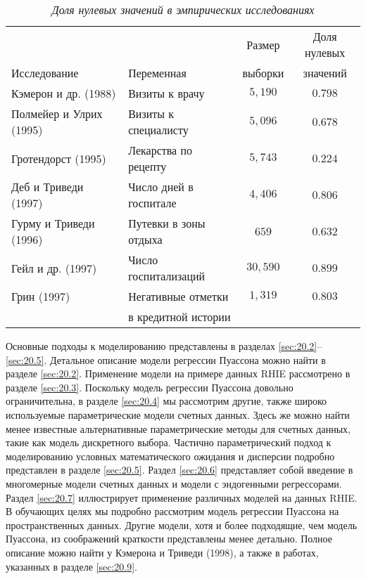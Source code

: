     \begin{table}[!ht]\caption{\textit{Доля нулевых значений в эмпирических исследованиях}}\label{tab:20.1}
    \begin{center}
\begin{tabular}{llcc}
\hline \hline
                          &               &Размер         &Доля нулевых\\
Исследование              &Переменная     &выборки        &значений\\
\hline
Кэмерон и др. (1988)     &Визиты к врачу&$5,190$&$0.798$\\
Полмейер и Улрих (1995) &Визиты к специалисту&$5,096$&$0.678$\\
Гротендорст (1995)       &Лекарства по рецепту&$5,743$&$0.224$\\
Деб и Триведи (1997)      &Число дней в госпитале&$4,406$&$0.806$\\
Гурму и Триведи (1996)    &Путевки в зоны отдыха&$659$&$0.632$\\
Гейл и др. (1997)        &Число госпитализаций&$30,590$&$0.899$\\
Грин (1997)             &Негативные отметки&$1,319$&$0.803$\\
                          &в кредитной истории&&\\
\hline \hline
    \end{tabular}
    \end{center}
    \end{table}

Основные подходы к моделированию представлены в разделах \ref{sec:20.2}--\ref{sec:20.5}. Детальное описание модели регрессии Пуассона можно найти в разделе \ref{sec:20.2}. Применение модели на примере данных RHIE рассмотрено в разделе \ref{sec:20.3}. Поскольку модель регрессии Пуассона довольно ограничительна, в разделе \ref{sec:20.4} мы рассмотрим другие, также широко используемые параметрические модели счетных данных. Здесь же можно найти менее известные альтернативные параметрические методы для счетных данных, такие как модель дискретного выбора. Частично параметрический подход к моделированию условных математического ожидания и дисперсии подробно представлен в разделе \ref{sec:20.5}. Раздел \ref{sec:20.6} представляет собой введение в многомерные модели счетных данных и модели с эндогенными регрессорами. Раздел \ref{sec:20.7} иллюстрирует применение различных моделей на данных RHIE. В обучающих целях мы подробно рассмотрим модель регрессии Пуассона на пространственных данных.  Другие модели, хотя и более подходящие, чем модель Пуассона, из соображений краткости представлены менее детально. Полное описание можно найти у Кэмерона и Триведи (1998), а также в работах, указанных в разделе \ref{sec:20.9}.




